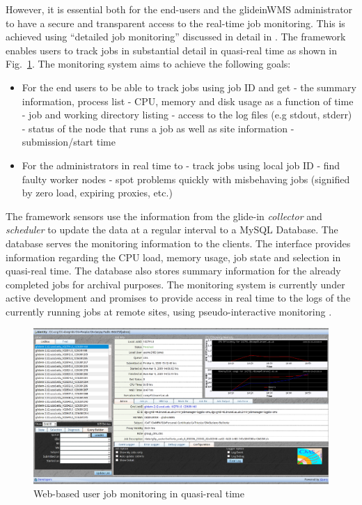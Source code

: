 \documentclass[a4paper]{jpconf}
\begin{document}
However, it is essential both for the end-users and the glideinWMS administrator to have 
a secure and transparent access to the real-time job monitoring. This is achieved using
``detailed job monitoring'' discussed in detail in \cite{bib:cms_jobmon}. The framework enables users to track jobs 
in substantial detail in quasi-real time as shown in Fig.~\ref{fig:jobMon}. The monitoring system aims to 
achieve the following goals:
\begin {itemize}
\item 
For the end users to be able to track jobs using job ID and get 
\subitem
- the summary information, process list
\subitem
- CPU, memory and disk usage as a function of time
\subitem
- job and working directory listing
\subitem
- access to the log files (e.g stdout, stderr)
\subitem
- status of the node that runs a job as well as site information
\subitem
- submission/start time
\item
For the administrators in real time to
\subitem
 - track jobs using local job ID
\subitem
- find faulty worker nodes
\subitem
- spot problems quickly with misbehaving jobs (signified by zero load, expiring proxies, etc.)
\end{itemize}
The framework sensors use the information from the glide-in \emph{collector} and \emph{scheduler} to
update the data at a regular interval to a MySQL Database. The database serves the monitoring 
information to the clients. The interface provides information regarding the CPU load, memory usage, 
job state and selection in quasi-real time. The database also stores summary information for the already completed 
jobs for archival purposes. The monitoring system is currently under active development and promises to provide access 
in real time to the logs of the currently running jobs at remote sites, using 
pseudo-interactive monitoring \cite{bib:pseudo_mon}.
\begin{figure}
\begin{center}
\includegraphics[scale=0.4]{jobMon.png}
\end{center}
\caption{Web-based user job monitoring in quasi-real time}
\label{fig:jobMon}
\end{figure}
\end{document}
